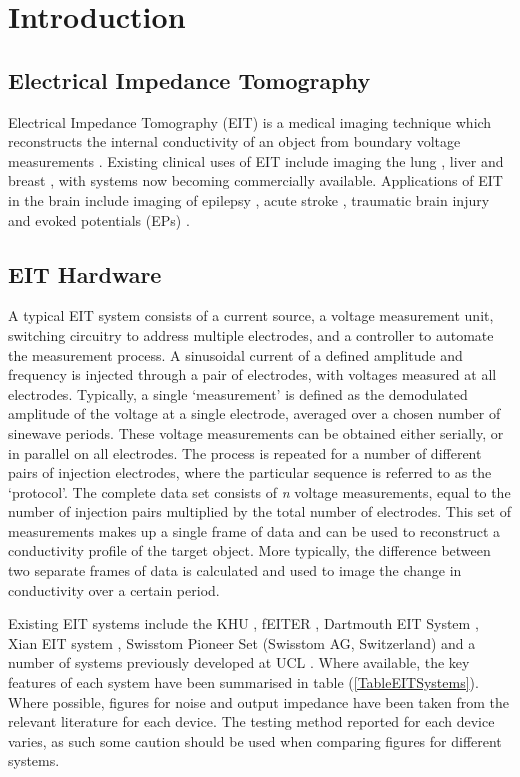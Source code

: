 \section{Introduction}

\subsection{Electrical Impedance Tomography}
Electrical Impedance Tomography (EIT) is a medical imaging technique which reconstructs the internal conductivity of an object from boundary voltage measurements \cite{Metherall1996}. Existing clinical uses of EIT include imaging the lung \cite{Frerichs_2000}, liver \cite{YOU_2009} and breast \cite{Halter}, with systems now becoming commercially available. Applications of EIT in the brain include imaging of epilepsy \cite{Vongerichten_2016,Fabrizi_2006}, acute stroke \cite{Dowrick_2016}, traumatic brain injury \cite{Manwaring2013} and evoked potentials (EPs) \cite{Aristovich_2016}. 
\subsection{EIT Hardware}

A typical EIT system consists of a current source, a voltage measurement unit, switching circuitry to address multiple electrodes, and a controller to automate the measurement process. A sinusoidal current of a defined amplitude and frequency is injected through a pair of electrodes, with voltages measured at all electrodes. Typically, a single `measurement' is defined as the demodulated amplitude of the voltage at a single electrode, averaged over a chosen number of sinewave periods. These voltage measurements can be obtained either serially, or in parallel on all electrodes. The process is repeated for a number of different pairs of injection electrodes, where the particular sequence is referred to as the `protocol'. The complete data set consists of \emph{n} voltage measurements, equal to the number of injection pairs multiplied by the total number of electrodes. This set of measurements makes up a single frame of data and can be used to reconstruct a conductivity profile of the target object. More typically, the difference between two separate frames of data is calculated and used to image the change in conductivity over a certain period.

Existing EIT systems include the KHU \cite{Hun_Wi_2014}, fEITER \cite{McCann_2011}, Dartmouth EIT System \cite{khan}, Xian EIT system \cite{Shi_Xuetao_2005}, Swisstom Pioneer Set (Swisstom AG, Switzerland) and a number of systems previously developed at UCL \cite{Oh2011} \cite{McEwan_2006}. Where available, the key features of each system have been summarised in table (\ref{TableEITSystems}). Where possible, 
figures for noise and output impedance have been taken from the relevant literature for each device. The testing method reported for each device varies, as such some caution should be used when comparing figures for different systems.
